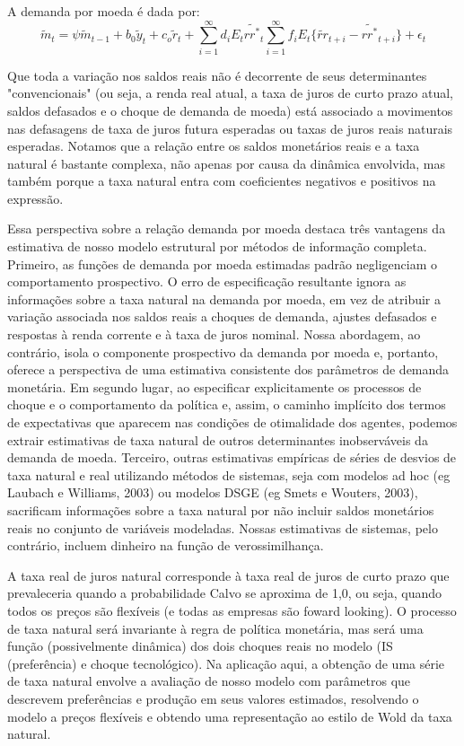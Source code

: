 \documentclass[11pt,oneside,a4paper]{article}
\begin{document}
A demanda por moeda é dada por:
$$\tilde{m}_t = \psi\tilde{m}_{t-1} + b_0 \tilde{y}_t + c_o \tilde{r}_t + \sum_{i=1}^{\infty} d_i E_t \tilde{rr^{*}}_t  \sum_{i=1}^{\infty} f_i E_t \{\tilde{rr}_{t+i} - \tilde{rr^{*}}_{t+i}  \} + \epsilon_t $$

Que toda a variação nos saldos reais não é decorrente de seus determinantes "convencionais" (ou seja, a renda real atual, a
taxa de juros de curto prazo atual, saldos defasados e o choque de demanda de moeda) está associado a movimentos nas defasagens de taxa de juros futura esperadas ou taxas de juros reais naturais esperadas. Notamos que a relação entre os saldos monetários reais e a taxa natural é bastante complexa, não apenas por causa da dinâmica envolvida, mas também porque a taxa natural entra com coeficientes negativos e positivos na expressão.

Essa perspectiva sobre a relação demanda por moeda destaca três vantagens da estimativa de nosso modelo estrutural por métodos de informação completa. Primeiro, as funções de demanda por moeda estimadas padrão negligenciam o comportamento prospectivo. O erro de especificação resultante ignora as informações sobre a taxa natural na demanda por moeda, em vez de atribuir a variação associada nos saldos reais a choques de demanda, ajustes defasados e respostas à renda corrente e à taxa de juros nominal. Nossa abordagem, ao contrário, isola o componente prospectivo da demanda por moeda e, portanto, oferece a perspectiva de uma estimativa consistente dos parâmetros de demanda monetária. Em segundo lugar, ao especificar explicitamente os processos de choque e o comportamento da política e, assim, o caminho implícito dos termos de expectativas que aparecem nas condições de otimalidade dos agentes, podemos extrair estimativas de taxa natural de outros determinantes inobserváveis da demanda de moeda. Terceiro, outras estimativas empíricas de séries de desvios de taxa natural e real utilizando métodos de sistemas, seja com modelos ad hoc (eg Laubach e Williams, 2003) ou modelos DSGE (eg Smets e Wouters, 2003), sacrificam informações sobre a taxa natural por não incluir saldos monetários reais no conjunto de variáveis modeladas. Nossas estimativas de sistemas, pelo contrário, incluem dinheiro na função de verossimilhança.

A taxa real de juros natural corresponde à taxa real de juros de curto prazo que prevaleceria quando a probabilidade Calvo se aproxima de 1,0, ou seja, quando todos os preços são flexíveis (e todas as empresas são foward looking). O processo de taxa natural será invariante à regra de política monetária, mas será uma função (possivelmente dinâmica) dos dois choques reais no modelo (IS (preferência) e choque tecnológico). Na aplicação aqui, a obtenção de uma série de taxa natural envolve a avaliação de nosso modelo com parâmetros que descrevem preferências e produção em seus valores estimados, resolvendo o modelo a preços flexíveis e obtendo uma representação ao estilo de Wold da taxa natural.
%
%
\end{document}
